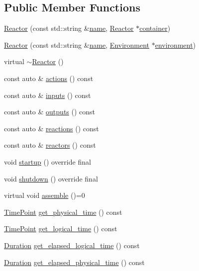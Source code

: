 \subsection*{Public Member Functions}
\begin{DoxyCompactItemize}
\item 
\hyperlink{classreactor_1_1Reactor_a277765a261141f60ea6e8565533eb71c}{Reactor} (const std\+::string \&\hyperlink{classreactor_1_1ReactorElement_a99579f61dbaf5d5d98aebfe26eb8bf77}{name}, \hyperlink{classreactor_1_1Reactor}{Reactor} $\ast$\hyperlink{classreactor_1_1ReactorElement_a25bf298de879a82eefc1ba426be05812}{container})
\item 
\hyperlink{classreactor_1_1Reactor_af00ec5a8d0efcca675fc06d474181371}{Reactor} (const std\+::string \&\hyperlink{classreactor_1_1ReactorElement_a99579f61dbaf5d5d98aebfe26eb8bf77}{name}, \hyperlink{classreactor_1_1Environment}{Environment} $\ast$\hyperlink{classreactor_1_1ReactorElement_a895b09f977450723c59b67b41e643db8}{environment})
\item 
virtual \hyperlink{classreactor_1_1Reactor_a71a86bb46592e350cf173db091be6d50}{$\sim$\+Reactor} ()
\item 
const auto \& \hyperlink{classreactor_1_1Reactor_a6d4a4847eaf1da2ee81d1bf43ace739f}{actions} () const
\item 
const auto \& \hyperlink{classreactor_1_1Reactor_a9907a15d57a068a9785f1f5e74d0802a}{inputs} () const
\item 
const auto \& \hyperlink{classreactor_1_1Reactor_a6ee91ecde81bbffbb04773f1ae9b97dd}{outputs} () const
\item 
const auto \& \hyperlink{classreactor_1_1Reactor_a8667762f07039e52bfa7925a2a0fefc4}{reactions} () const
\item 
const auto \& \hyperlink{classreactor_1_1Reactor_ac69d7467dc9ec3db24a0c71e249d7eba}{reactors} () const
\item 
void \hyperlink{classreactor_1_1Reactor_ad254458867114f09a72e1e285ffc03d2}{startup} () override final
\item 
void \hyperlink{classreactor_1_1Reactor_ac65caf31e633bd76c45c794072afb56e}{shutdown} () override final
\item 
virtual void \hyperlink{classreactor_1_1Reactor_ac9d30ad0bc15043f154a59a4a390ab9f}{assemble} ()=0
\item 
\hyperlink{namespacereactor_ad950f8d1a46612500286a4af0f167080}{Time\+Point} \hyperlink{classreactor_1_1Reactor_abfdf519fd67c4fc13debc60dbc68bec3}{get\+\_\+physical\+\_\+time} () const
\item 
\hyperlink{namespacereactor_ad950f8d1a46612500286a4af0f167080}{Time\+Point} \hyperlink{classreactor_1_1Reactor_ae3b8bb1187b16901c8a140090579e6c9}{get\+\_\+logical\+\_\+time} () const
\item 
\hyperlink{namespacereactor_aa8375b807a80703545664096c5b5b779}{Duration} \hyperlink{classreactor_1_1Reactor_a4983e0e04f14212630b0a7da1f463239}{get\+\_\+elapsed\+\_\+logical\+\_\+time} () const
\item 
\hyperlink{namespacereactor_aa8375b807a80703545664096c5b5b779}{Duration} \hyperlink{classreactor_1_1Reactor_a206bd63d5ad7c2c39a89d9220f0acbbc}{get\+\_\+elapsed\+\_\+physical\+\_\+time} () const
\end{DoxyCompactItemize}
